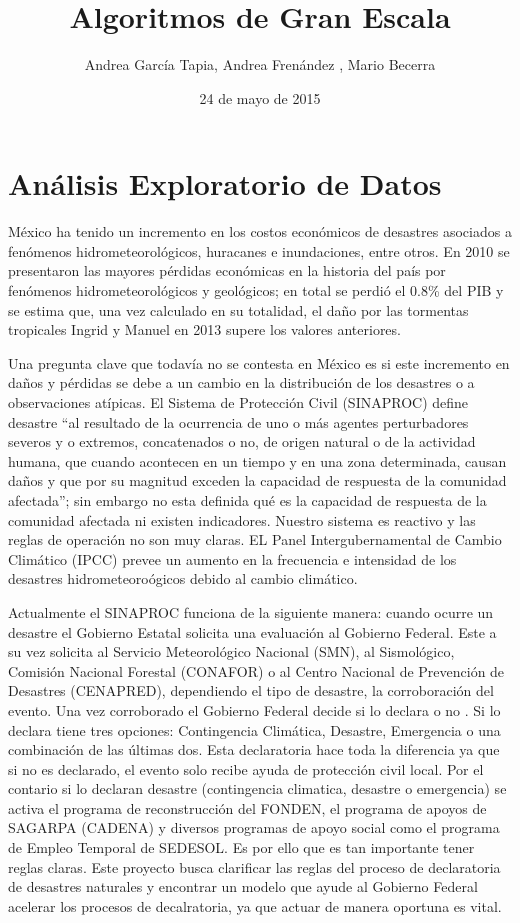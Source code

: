 \documentclass[]{article}
\title{Algoritmos de Gran Escala}
\author{Andrea García Tapia, Andrea Frenández , Mario Becerra}
\date{24 de mayo de 2015}
\begin{document}
\maketitle


{
\hypersetup{linkcolor=black}
\setcounter{tocdepth}{2}
\tableofcontents
}
\pagebreak

\section{Análisis Exploratorio de
Datos}\label{analisis-exploratorio-de-datos}

México ha tenido un incremento en los costos económicos de desastres
asociados a fenómenos hidrometeorológicos, huracanes e inundaciones,
entre otros. En 2010 se presentaron las mayores pérdidas económicas en
la historia del país por fenómenos hidrometeorológicos y geológicos; en
total se perdió el 0.8\% del PIB y se estima que, una vez calculado en
su totalidad, el daño por las tormentas tropicales Ingrid y Manuel en
2013 supere los valores anteriores.

Una pregunta clave que todavía no se contesta en México es si este
incremento en daños y pérdidas se debe a un cambio en la distribución de
los desastres o a observaciones atípicas. El Sistema de Protección Civil
(SINAPROC) define desastre ``al resultado de la ocurrencia de uno o más
agentes perturbadores severos y o extremos, concatenados o no, de origen
natural o de la actividad humana, que cuando acontecen en un tiempo y en
una zona determinada, causan daños y que por su magnitud exceden la
capacidad de respuesta de la comunidad afectada''; sin embargo no esta
definida qué es la capacidad de respuesta de la comunidad afectada ni
existen indicadores. Nuestro sistema es reactivo y las reglas de
operación no son muy claras. EL Panel Intergubernamental de Cambio
Climático (IPCC) prevee un aumento en la frecuencia e intensidad de los
desastres hidrometeoroógicos debido al cambio climático.

Actualmente el SINAPROC funciona de la siguiente manera: cuando ocurre
un desastre el Gobierno Estatal solicita una evaluación al Gobierno
Federal. Este a su vez solicita al Servicio Meteorológico Nacional
(SMN), al Sismológico, Comisión Nacional Forestal (CONAFOR) o al Centro
Nacional de Prevención de Desastres (CENAPRED), dependiendo el tipo de
desastre, la corroboración del evento. Una vez corroborado el Gobierno
Federal decide si lo declara o no . Si lo declara tiene tres opciones:
Contingencia Climática, Desastre, Emergencia o una combinación de las
últimas dos. Esta declaratoria hace toda la diferencia ya que si no es
declarado, el evento solo recibe ayuda de protección civil local. Por el
contario si lo declaran desastre (contingencia climatica, desastre o
emergencia) se activa el programa de reconstrucción del FONDEN, el
programa de apoyos de SAGARPA (CADENA) y diversos programas de apoyo
social como el programa de Empleo Temporal de SEDESOL. Es por ello que
es tan importante tener reglas claras. Este proyecto busca clarificar
las reglas del proceso de declaratoria de desastres naturales y
encontrar un modelo que ayude al Gobierno Federal acelerar los procesos
de decalratoria, ya que actuar de manera oportuna es vital.
\end{document}
